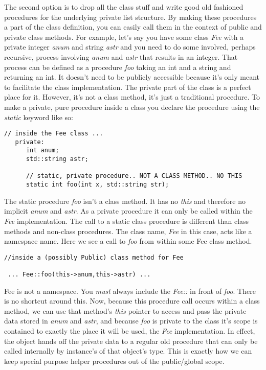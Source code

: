 \documentclass[10pt]{article}
\begin{document}
The second option is to drop all the class stuff and write good old fashioned procedures for the underlying private list structure. By making these procedures a part of the class definition, you can easily call them in the context of public and private class methods. For example, let's say you have some class \textit{Fee} with a private integer \textit{anum} and string \textit{astr} and you need to do some involved, perhaps recursive, process involving \textit{anum} and \textit{astr} that results in an integer. That process can be defined as a procedure \textit{foo} taking an int and a string and returning an int. It doesn't need to be publicly accessible because it's only meant to facilitate the class implementation. The private part of the class is a perfect place for it. However, it's not a class method, it's just a traditional procedure. To make a private, pure procedure inside a class you declare the procedure using the \textit{static} keyword like so:
\begin{verbatim}
// inside the Fee class ...  
   private: 
      int anum;
      std::string astr;
      
      // static, private procedure.. NOT A CLASS METHOD.. NO THIS
      static int foo(int x, std::string str);
\end{verbatim}

The static procedure \textit{foo} isn't a class method. It has no \textit{this} and therefore no implicit \textit{anum} and \textit{astr}.  As a private procedure it can only be called within the \textit{Fee} implementation. The call to a static class procedure is different than class methods and non-class procedures. The class name, \textit{Fee} in this case, acts like a namespace name. Here we see a call to \textit{foo} from within some Fee class method.
\begin{verbatim}
//inside a (possibly Public) class method for Fee

 ... Fee::foo(this->anum,this->astr) ...
\end{verbatim}
Fee is not a namespace. You \textit{must} always include the \textit{Fee::} in front of \textit{foo}. There is no shortcut around this. Now, because this procedure call occurs within a class method, we can use that method's \textit{this} pointer to access and pass the private data stored in \textit{anum} and \textit{astr}, and because \textit{foo} is private to the class it's scope is contained to exactly the place it will be used, the \textit{Fee} implementation. In effect, the object hands off the private data to a regular old procedure that can only be called internally by instance's of that object's type. This is exactly how we can keep special purpose helper procedures out of the public/global scope. 
\end{document}
